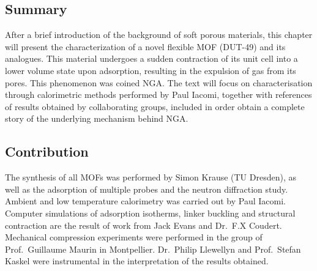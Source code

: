 \subsection*{Summary}

After a brief introduction of the background of soft porous 
materials, this chapter will present the characterization of a novel
flexible \gls{MOF} (DUT-49) and its analogues. This material undergoes
a sudden contraction of its unit cell into a lower volume state
upon adsorption, resulting in the expulsion of gas from its pores.
This phenomenon was coined \gls{NGA}.
The text will focus on characterisation through calorimetric methods
performed by Paul Iacomi, together with references
of results obtained by collaborating groups, included in order
obtain a complete story of the underlying mechanism behind \gls{NGA}.

\subsection*{Contribution}

The synthesis of all \glspl{MOF} was performed by Simon Krause
(TU Dresden), as well as the adsorption of multiple probes 
and the neutron diffraction study.
Ambient and low temperature calorimetry was carried out by 
Paul Iacomi. Computer simulations of adsorption isotherms, 
linker buckling and structural contraction
are the result of work from Jack Evans and Dr.\ F.X Coudert.
Mechanical compression experiments were performed in 
the group of Prof.\ Guillaume Maurin in Montpellier.
Dr.\ Philip Llewellyn and Prof.\ Stefan Kaskel were 
instrumental in the interpretation of the results obtained.
